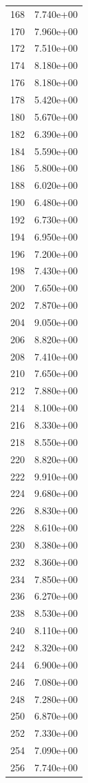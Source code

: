 \documentclass[12pt]{article}
\begin{document}
\begin{longtable}{@{}cc@{}}
168 & 7.740e+00 \\
170 & 7.960e+00 \\
172 & 7.510e+00 \\
174 & 8.180e+00 \\
176 & 8.180e+00 \\
178 & 5.420e+00 \\
180 & 5.670e+00 \\
182 & 6.390e+00 \\
184 & 5.590e+00 \\
186 & 5.800e+00 \\
188 & 6.020e+00 \\
190 & 6.480e+00 \\
192 & 6.730e+00 \\
194 & 6.950e+00 \\
196 & 7.200e+00 \\
198 & 7.430e+00 \\
200 & 7.650e+00 \\
202 & 7.870e+00 \\
204 & 9.050e+00 \\
206 & 8.820e+00 \\
208 & 7.410e+00 \\
210 & 7.650e+00 \\
212 & 7.880e+00 \\
214 & 8.100e+00 \\
216 & 8.330e+00 \\
218 & 8.550e+00 \\
220 & 8.820e+00 \\
222 & 9.910e+00 \\
224 & 9.680e+00 \\
226 & 8.830e+00 \\
228 & 8.610e+00 \\
230 & 8.380e+00 \\
232 & 8.360e+00 \\
234 & 7.850e+00 \\
236 & 6.270e+00 \\
238 & 8.530e+00 \\
240 & 8.110e+00 \\
242 & 8.320e+00 \\
244 & 6.900e+00 \\
246 & 7.080e+00 \\
248 & 7.280e+00 \\
250 & 6.870e+00 \\
252 & 7.330e+00 \\
254 & 7.090e+00 \\
256 & 7.740e+00 \\

\end{longtable}
\end{document}
